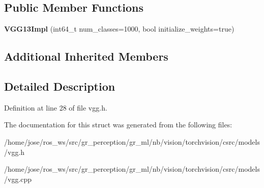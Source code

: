 \subsection*{Public Member Functions}
\begin{DoxyCompactItemize}
\item 
\mbox{\label{structvision_1_1models_1_1VGG13Impl_a4e4c38f85932a71ec0740fb736a1d529}} 
{\bfseries V\+G\+G13\+Impl} (int64\+\_\+t num\+\_\+classes=1000, bool initialize\+\_\+weights=true)
\end{DoxyCompactItemize}
\subsection*{Additional Inherited Members}


\subsection{Detailed Description}


Definition at line 28 of file vgg.\+h.



The documentation for this struct was generated from the following files\+:\begin{DoxyCompactItemize}
\item 
/home/jose/ros\+\_\+ws/src/gr\+\_\+perception/gr\+\_\+ml/nb/vision/torchvision/csrc/models/vgg.\+h\item 
/home/jose/ros\+\_\+ws/src/gr\+\_\+perception/gr\+\_\+ml/nb/vision/torchvision/csrc/models/vgg.\+cpp\end{DoxyCompactItemize}

